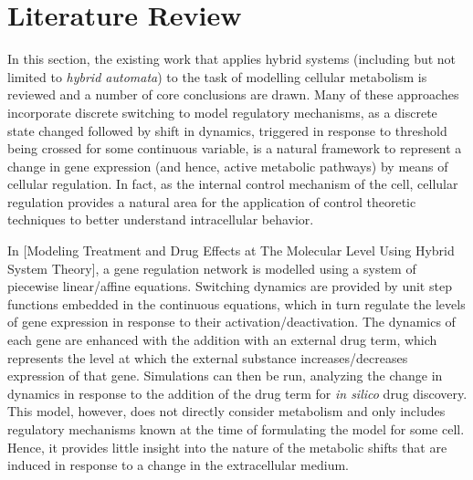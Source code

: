 \chapter{Literature Review}\label{chap:lit}

In this section, the existing work that applies hybrid systems (including but not limited to \textit{hybrid automata}) to the task of modelling cellular metabolism is reviewed and a number of core conclusions are drawn. Many of these approaches incorporate discrete switching to model regulatory mechanisms, as a discrete state changed followed by shift in dynamics, triggered in response to threshold being crossed for some continuous variable, is a natural framework to represent a change in gene expression (and hence, active metabolic pathways) by means of cellular regulation. In fact, as the internal control mechanism of the cell, cellular regulation provides a natural area for the application of control theoretic techniques to better understand intracellular behavior.

In [Modeling Treatment and Drug Effects at The Molecular Level Using
Hybrid System Theory], a gene regulation network is modelled using a system of piecewise linear/affine equations. Switching dynamics are provided by unit step functions embedded in the continuous equations, which in turn regulate the levels of gene expression in response to their activation/deactivation. The dynamics of each gene are enhanced with the addition with an external drug term, which represents the level at which the external substance increases/decreases expression of that gene. Simulations can then be run, analyzing the change in dynamics in response to the addition of the drug term for \textit{in silico} drug discovery. This model, however, does not directly consider metabolism and only includes regulatory mechanisms known at the time of formulating the model for some cell. Hence, it provides little insight into the nature of the metabolic shifts that are induced in response to a change in the extracellular medium.

